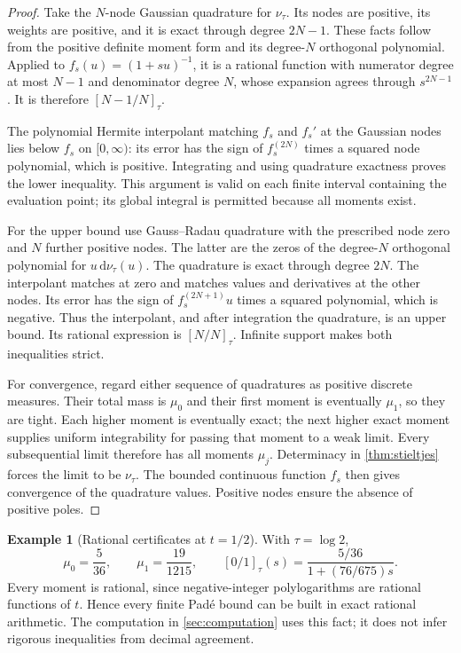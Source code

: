 \documentclass[11pt,a4paper]{article}
\newcommand{\dd}{\,\mathrm d}
\numberwithin{equation}{section}
\theoremstyle{plain}
\theoremstyle{definition}
\newtheorem{example}[theorem]{Example}
\theoremstyle{remark}
\begin{document}
\begin{proof}
Take the $N$-node Gaussian quadrature for $\nu_\tau$. Its nodes are positive,
its weights are positive, and it is exact through degree $2N-1$. These facts
follow from the positive definite moment form and its degree-$N$ orthogonal
polynomial. Applied to $f_s(u)=(1+su)^{-1}$, it is a rational function with
numerator degree at most $N-1$ and denominator degree $N$, whose expansion
agrees through $s^{2N-1}$. It is therefore $[N-1/N]_\tau$.

The polynomial Hermite interpolant matching $f_s$ and $f_s'$ at the Gaussian
nodes lies below $f_s$ on $[0,\infty)$: its error has the sign of
$f_s^{(2N)}$ times a squared node polynomial, which is positive. Integrating
and using quadrature exactness proves the lower inequality. This argument is
valid on each finite interval containing the evaluation point; its global
integral is permitted because all moments exist.

For the upper bound use Gauss--Radau quadrature with the prescribed node zero
and $N$ further positive nodes. The latter are the zeros of the degree-$N$
orthogonal polynomial for $u\dd\nu_\tau(u)$. The quadrature is exact through
degree $2N$. The interpolant matches at zero and matches values and
derivatives at the other nodes. Its error has the sign of
$f_s^{(2N+1)}u$ times a squared polynomial, which is negative. Thus the
interpolant, and after integration the quadrature, is an upper bound. Its
rational expression is $[N/N]_\tau$. Infinite support makes both inequalities
strict.

For convergence, regard either sequence of quadratures as positive discrete
measures. Their total mass is $\mu_0$ and their first moment is eventually
$\mu_1$, so they are tight. Each higher moment is eventually exact; the next
higher exact moment supplies uniform integrability for passing that moment
to a weak limit. Every subsequential limit therefore has all moments
$\mu_j$. Determinacy in \cref{thm:stieltjes} forces the limit to be
$\nu_\tau$. The bounded continuous function $f_s$ then gives convergence of
the quadrature values. Positive nodes ensure the absence of positive poles.
\end{proof}

\begin{example}[Rational certificates at $t=1/2$]
With $\tau=\log2$,
\[
 \mu_0=\frac5{36},\qquad \mu_1=\frac{19}{1215},\qquad
 [0/1]_\tau(s)=\frac{5/36}{1+(76/675)s}.
\]
Every moment is rational, since negative-integer polylogarithms are rational
functions of $t$. Hence every finite Pad\'e bound can be built in exact
rational arithmetic. The computation in \cref{sec:computation} uses this fact;
it does not infer rigorous inequalities from decimal agreement.
\end{example}
\end{document}

